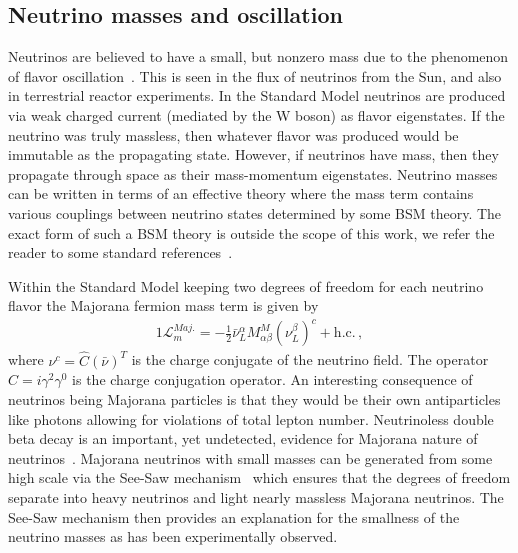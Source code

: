 \documentclass[universe,article,submit,moreauthors,pdftex,a4paper]{Definitions/mdpi}
\newcommand*{\xblue}{\color{black}}
\begin{document}
\subsection{Neutrino masses and oscillation} \label{sec:Neutrinos}
\noindent Neutrinos are believed to have a small, but nonzero mass due to the phenomenon of flavor oscillation~\cite{SuperKamiokande:1998kpq,KamLAND:2002uet,Fogli:2005cq}. This is seen in the flux of neutrinos from the Sun, and also in terrestrial reactor experiments. In the Standard Model neutrinos are produced via weak charged current (mediated by the W boson) as flavor eigenstates. If the neutrino was truly massless, then whatever flavor was produced would be immutable as the propagating state. However, if neutrinos have mass, then they propagate through space as their mass-momentum eigenstates. 
Neutrino masses can be written in terms of an effective theory where the mass term contains various couplings between neutrino states determined by some BSM theory. The exact form of such a BSM theory is outside the scope of this work, we refer the reader to some standard references~\cite{Giunti:2014ixa,Fritzsch:1999ee,giunti2007fundamentals,Fritzsch:2015gxa}.

{\xblue Within the Standard Model keeping two degrees of freedom for each neutrino flavor the} Majorana fermion mass term is given by
\begin{alignat}{1}
	\label{Majorana} \mathcal{L}_{m}^{Maj.} = -\frac{1}{2}\bar{\nu}^{\alpha}_{L}M^{M}_{\alpha\beta}(\nu^{\beta}_{L})^{c}+\mathrm{h.c.}\,,
\end{alignat}
where $\nu^{c} = \hat{C}(\bar{\nu})^{T}$ is the charge conjugate of the neutrino field. The operator $\hat{C} = i\gamma^{2}\gamma^{0}$ is the charge conjugation operator. {\xblue An interesting consequence of neutrinos being Majorana particles is that they would be their own antiparticles like photons allowing for violations of total lepton number. Neutrinoless double beta decay is an important, yet undetected, evidence for Majorana nature of neutrinos~\cite{Dolinski:2019nrj}.} Majorana neutrinos with small masses can be generated from some high scale via the See-Saw mechanism~\cite{Arkani-Hamed:1998wuz,Ellis:1999my,Casas:2001sr} which ensures that the degrees of freedom separate into heavy neutrinos and light nearly massless Majorana neutrinos. The See-Saw mechanism then provides an explanation for the smallness of the neutrino masses as has been experimentally observed.
\end{document}
